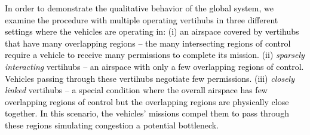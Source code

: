 \label{ssec:SimSet}
\textcolor{black}{In order to demonstrate the qualitative behavior of the global system, we examine the procedure with multiple operating vertihubs in three different settings where the vehicles are operating in: 
(i) an airspace covered by vertihubs that have many overlapping regions -- the many intersecting regions of control require a vehicle to receive many permissions to complete its mission.
(ii) \emph{sparsely interacting} vertihubs -- an airspace with only a few overlapping regions of control. Vehicles passing through these vertihubs negotiate few permissions.
 (iii) \emph{closely linked} vertihubs -- a special condition where the overall airspace has few overlapping regions of control but the overlapping regions are physically close together. In this scenario, the vehicles' missions compel them to pass through these regions simulating congestion a potential bottleneck. 
 } 


